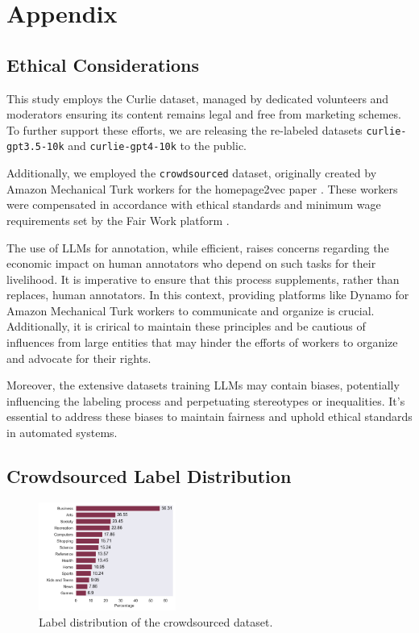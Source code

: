 \section{Appendix}

\subsection{Ethical Considerations}\label{appendix:ethical-considerations}
This study employs the Curlie dataset, managed by dedicated volunteers and moderators ensuring its content remains legal and free from marketing schemes. 
To further support these efforts, we are releasing the re-labeled datasets \texttt{curlie-gpt3.5-10k} and \texttt{curlie-gpt4-10k} to the public.

Additionally, we employed the \texttt{crowdsourced} dataset, originally created by Amazon Mechanical Turk workers for the homepage2vec paper \cite{homepage2vec}. 
These workers were compensated in accordance with ethical standards and minimum wage requirements set by the Fair Work platform \cite{ethics2}.


The use of LLMs for annotation, while efficient, raises concerns regarding the economic impact on human annotators who depend on such tasks for their livelihood. 
It is imperative to ensure that this process supplements, rather than replaces, human annotators. In this context, providing platforms like Dynamo \cite{ethics1} for Amazon Mechanical Turk workers to communicate and organize is crucial.
Additionally, it is crirical to maintain these principles and be cautious of influences from large entities that may hinder the efforts of workers to organize and advocate for their rights.

Moreover, the extensive datasets training LLMs may contain biases, potentially influencing the labeling process and perpetuating stereotypes or inequalities. 
It's essential to address these biases to maintain fairness and uphold ethical standards in automated systems.

\subsection{Crowdsourced Label Distribution}

\begin{figure}[!ht]
    \centering
    \includegraphics[width=0.4\textwidth]{./figures/category_distribution.png}
    \caption{Label distribution of the crowdsourced dataset.}
    \label{fig:label-distribution}
\end{figure}

